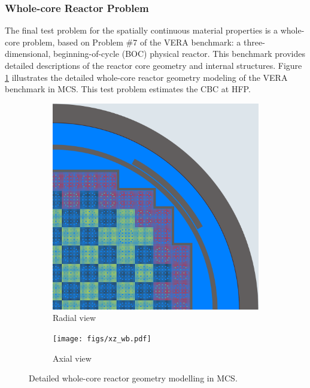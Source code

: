 \subsubsection{Whole-core Reactor Problem} \label{wc}

The final test problem for the spatially continuous material properties is a whole-core problem, based on Problem \#7 of the VERA benchmark: a three-dimensional, beginning-of-cycle (BOC) physical reactor. This benchmark provides detailed descriptions of the reactor core geometry and internal structures. Figure \ref{fig_4a} illustrates the detailed whole-core reactor geometry modeling of the VERA benchmark in MCS. This test problem estimates the CBC at HFP.

\begin{figure}
    \centering
    \begin{subfigure}[b]{0.55\textwidth}
        \centering
        \includegraphics[width=\textwidth]{figs/xy_wb.pdf}
        \caption{Radial view}
    \end{subfigure}
    \hspace{10em}
    \begin{subfigure}[b]{0.36\textwidth}
        \centering
        \texttt{[image: figs/xz\_wb.pdf]}
        \caption{Axial view}
    \end{subfigure}
    \caption{Detailed whole-core reactor geometry modelling in MCS.}
       \label{fig_4a}
\end{figure}

